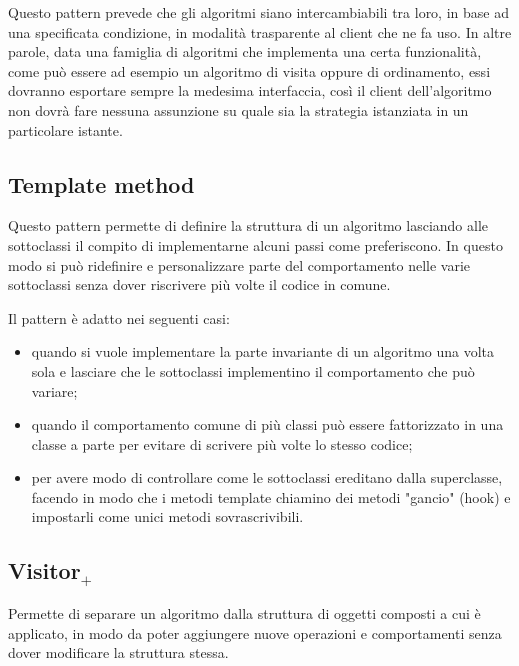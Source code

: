 Questo pattern prevede che gli algoritmi siano intercambiabili tra loro, in base ad una specificata condizione, in modalità trasparente al client che ne fa uso. In altre parole, data una famiglia di algoritmi che implementa una certa funzionalità, come può essere ad esempio un algoritmo di visita oppure di ordinamento, essi dovranno esportare sempre la medesima interfaccia, così il client dell'algoritmo non dovrà fare nessuna assunzione su quale sia la strategia istanziata in un particolare istante.

\subsection{Template method}
Questo pattern permette di definire la struttura di un algoritmo lasciando alle sottoclassi il compito di implementarne alcuni passi come preferiscono. In questo modo si può ridefinire e personalizzare parte del comportamento nelle varie sottoclassi senza dover riscrivere più volte il codice in comune.

Il pattern è adatto nei seguenti casi:
\begin{itemize}
\item quando si vuole implementare la parte invariante di un algoritmo una volta sola e lasciare che le sottoclassi implementino il comportamento che può variare;
\item quando il comportamento comune di più classi può essere fattorizzato in una classe a parte per evitare di scrivere più volte lo stesso codice;
\item per avere modo di controllare come le sottoclassi ereditano dalla superclasse, facendo in modo che i metodi template chiamino dei metodi "gancio" (hook) e impostarli come unici metodi sovrascrivibili.
\end{itemize}

\subsection{Visitor$_+$}
Permette di separare un algoritmo dalla struttura di oggetti composti a cui è applicato, in modo da poter aggiungere nuove operazioni e comportamenti senza dover modificare la struttura stessa.

